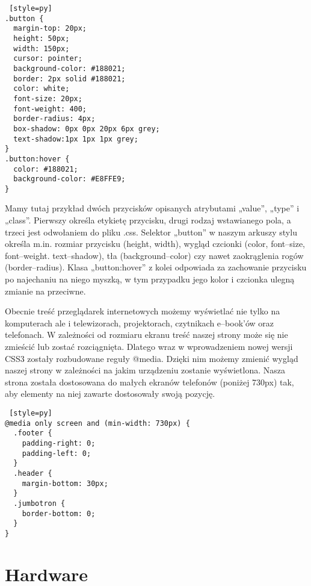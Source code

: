 \documentclass{xmgr}
\begin{document}
\begin{lstlisting} [style=py]
.button {
  margin-top: 20px;
  height: 50px;
  width: 150px;
  cursor: pointer;
  background-color: #188021;
  border: 2px solid #188021;
  color: white;
  font-size: 20px;
  font-weight: 400;
  border-radius: 4px;
  box-shadow: 0px 0px 20px 6px grey;
  text-shadow:1px 1px 1px grey;
}
.button:hover {
  color: #188021;
  background-color: #E8FFE9;
}
\end{lstlisting}

Mamy tutaj przykład dwóch przycisków opisanych atrybutami „value”, „type” i „class”. Pierwszy określa etykietę przycisku, drugi rodzaj wstawianego pola, a trzeci jest odwołaniem do pliku .css. Selektor „button” w naszym arkuszy stylu określa m.in. rozmiar przycisku (height, width), wygląd czcionki (color, font--size, font--weight. text--shadow), tła (background--color) czy nawet zaokrąglenia rogów (border--radius). Klasa „button:hover” z kolei odpowiada za zachowanie przycisku po najechaniu na niego myszką, w tym przypadku jego kolor i czcionka ulegną zmianie na przeciwne. 

 Obecnie treść przeglądarek internetowych możemy wyświetlać nie tylko na komputerach ale i telewizorach, projektorach, czytnikach e--book’ów oraz telefonach. W zależności od rozmiaru ekranu treść naszej strony może się nie zmieścić lub zostać rozciągnięta. Dlatego wraz w wprowadzeniem nowej wersji CSS3 zostały rozbudowane reguły @media. Dzięki nim możemy zmienić wygląd naszej strony w zależności na jakim urządzeniu zostanie wyświetlona. Nasza strona została dostosowana do małych ekranów telefonów (poniżej 730px) tak, aby elementy na niej zawarte dostosowały swoją pozycję. 

\hspace{2cm}
\begin{lstlisting} [style=py]
@media only screen and (min-width: 730px) {
  .footer {
    padding-right: 0;
    padding-left: 0;
  }
  .header {
    margin-bottom: 30px;
  }
  .jumbotron {
    border-bottom: 0;
  }
}
\end{lstlisting}


\chapter{Hardware\label{PRZEGLAD.NARZEDZI}}

\end{document}

